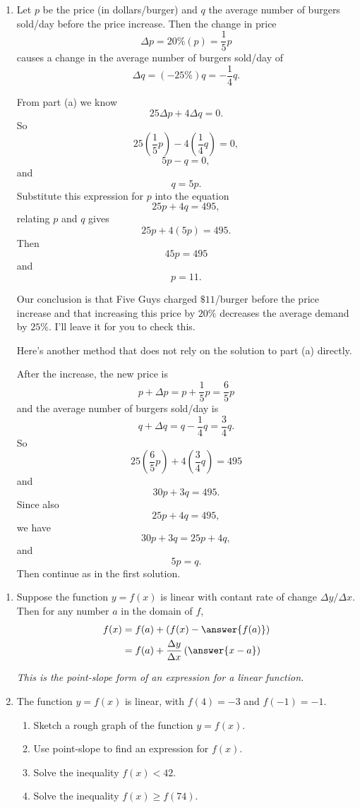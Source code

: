 \documentclass{ximera}
\begin{document}
\begin{question}
\begin{explanation}
\begin{enumerate}
\item Let $p$ be the price (in dollars/burger) and $q$ the average number of burgers sold/day before the price increase. Then the change in price
\[
   \Delta p = 20\%(p) = \frac{1}{5}p
\] 
causes a change in the average number of burgers sold/day of
\[
    \Delta q = (-25\%)q = -\frac{1}{4}q.
\] 

From part (a) we know
\[
 25 \Delta p  + 4 \Delta q = 0.
\]
So
\[
 25 \left(  \frac{1}{5}p \right) - 4 \left( \frac{1}{4}q \right) = 0,
\]
\[
    5p - q = 0,
\]
and 
\[
  q  =5p.
\]
Substitute this expression for $p$ into the equation
\[
      25p + 4q = 495,
\]
relating $p$ and $q$ gives
\[
     25p + 4 (5p) = 495.
\]
Then 
\[
    45p =495
\]
and 
\[
  p = 11.
\]

Our conclusion is that Five Guys charged $\$11$/burger before the price increase and that increasing this price by $20\%$ decreases the average demand by $25\%$. I'll leave it for you to check this.

Here's another method that does not rely on the solution to part (a) directly.

After the increase, the new price is
\[
     p + \Delta p = p +\frac{1}{5}p =  \frac{6}{5}p
\]
and the average number of burgers sold/day is
\[
   q + \Delta q = q - \frac{1}{4}q =  \frac{3}{4}q.
\] 
So
\[
  25 \left(  \frac{6}{5}p \right)  + 4 \left( \frac{3}{4}q \right) = 495
\]
and
\[
     30p + 3q = 495.
\]
Since also
\[
      25p + 4q = 495,
\]
we have
\[
  30p + 3q = 25p + 4q,
\]
and
\[
    5p = q.
\]
Then continue as in the first solution.
\end{enumerate}
\end{explanation}

\end{question}

\begin{question} \label{QKdfder33}
\begin{enumerate}
\item Suppose the function $y=f(x)$ is linear with contant rate of change $\Delta y / \Delta x$. Then for any number $a$ in the domain of $f$, 
\begin{align*}
  f(x) &= f(a) + (f(x) - \answer{f(a)})  \\
        &= f(a) + \frac{\Delta y}{\Delta x} \left( \answer{x-a} \right)
\end{align*}

\emph{This is the point-slope form of an expression for a linear function.}

\item The function $y=f(x)$ is linear, with $f(4)=-3$ and $f(-1)=-1$. 
\begin{enumerate}
\item Sketch a rough graph of the function $y=f(x)$.
\item Use point-slope to find an expression for $f(x)$.
\item Solve the inequality $f(x) < 42$.
\item Solve the inequality $f(x) \geq f(74)$.
\end{enumerate}
\end{enumerate}
\end{question}
\end{document}
